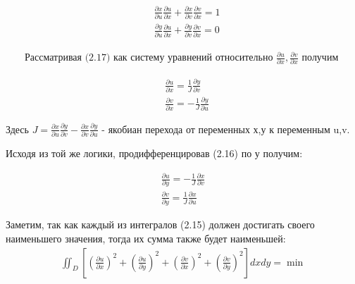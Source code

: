 \documentclass[a4paper,14pt,russian]{extreport}
\renewcommand{\_}{\kern-1.5pt\textunderscore\kern-1.5pt}
\begin{document}
\begin{equation}
\begin{aligned}
& \frac{\partial x}{\partial u} \frac{\partial u}{\partial x}+\frac{\partial x}{\partial v} \frac{\partial v}{\partial x}=1 \\[10pt]
& \frac{\partial y}{\partial u} \frac{\partial u}{\partial x}+\frac{\partial y}{\partial v} \frac{\partial v}{\partial x}=0
\end{aligned}
\end{equation}

\begin{equation*}
\begin{aligned}
\text {Рассматривая (2.17) как систему уравнений относительно } \frac{\partial u}{\partial x}, \frac{\partial v}{\partial x} \text { получим }
\end{aligned}
\end{equation*}

\begin{equation}
\begin{aligned}
& \frac{\partial u}{\partial x} = \frac{1}{J} \frac{\partial y}{\partial v} \\
& \frac{\partial v}{\partial x} = -\frac{1}{J} \frac{\partial y}{\partial u}
\end{aligned}
\end{equation}


Здесь $J=\frac{\partial x}{\partial u} \frac{\partial y}{\partial v}-\frac{\partial x}{\partial v} \frac{\partial y}{\partial u}$ - якобиан перехода от переменных х,у к переменным u,v.

Исходя из той же логики, продифференцировав (2.16) по у получим:

\begin{equation}
\begin{gathered}
\frac{\partial u}{\partial y} = -\frac{1}{J} \frac{\partial x}{\partial v} \\
\frac{\partial v}{\partial y} = \frac{1}{J} \frac{\partial x}{\partial u}
\end{gathered}
\end{equation}


Заметим, так как каждый из интегралов (2.15) должен достигать своего наименьшего значения, тогда их сумма также будет наименьшей:
\begin{equation}
\begin{gathered}
\iint_D\left[\left(\frac{\partial u}{\partial x}\right)^2+\left(\frac{\partial u}{\partial y}\right)^2+\left(\frac{\partial v}{\partial x}\right)^2+\left(\frac{\partial v}{\partial y}\right)^2\right] d x d y=\min
\end{gathered}
\end{equation}
\end{document}
